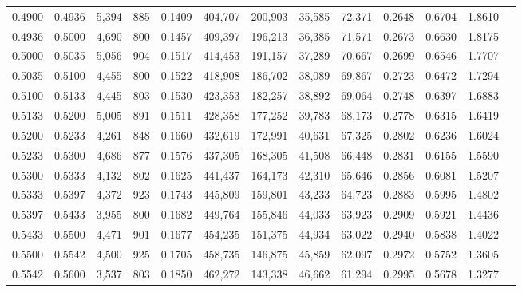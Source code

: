 \begin{tabular}{rrrrrrrrrrrrr}
0.4900 & 0.4936 &  5,394 &   885 &                                     0.1409 & 404,707 & 200,903 &  35,585 &  72,371 & 0.2648 & 0.6704 & 1.8610 \\
0.4936 & 0.5000 &  4,690 &   800 &                                     0.1457 & 409,397 & 196,213 &  36,385 &  71,571 & 0.2673 & 0.6630 & 1.8175 \\
0.5000 & 0.5035 &  5,056 &   904 &                                     0.1517 & 414,453 & 191,157 &  37,289 &  70,667 & 0.2699 & 0.6546 & 1.7707 \\
0.5035 & 0.5100 &  4,455 &   800 &                                     0.1522 & 418,908 & 186,702 &  38,089 &  69,867 & 0.2723 & 0.6472 & 1.7294 \\
0.5100 & 0.5133 &  4,445 &   803 &                                     0.1530 & 423,353 & 182,257 &  38,892 &  69,064 & 0.2748 & 0.6397 & 1.6883 \\
0.5133 & 0.5200 &  5,005 &   891 &                                     0.1511 & 428,358 & 177,252 &  39,783 &  68,173 & 0.2778 & 0.6315 & 1.6419 \\
0.5200 & 0.5233 &  4,261 &   848 &                                     0.1660 & 432,619 & 172,991 &  40,631 &  67,325 & 0.2802 & 0.6236 & 1.6024 \\
0.5233 & 0.5300 &  4,686 &   877 &                                     0.1576 & 437,305 & 168,305 &  41,508 &  66,448 & 0.2831 & 0.6155 & 1.5590 \\
0.5300 & 0.5333 &  4,132 &   802 &                                     0.1625 & 441,437 & 164,173 &  42,310 &  65,646 & 0.2856 & 0.6081 & 1.5207 \\
0.5333 & 0.5397 &  4,372 &   923 &                                     0.1743 & 445,809 & 159,801 &  43,233 &  64,723 & 0.2883 & 0.5995 & 1.4802 \\
0.5397 & 0.5433 &  3,955 &   800 &                                     0.1682 & 449,764 & 155,846 &  44,033 &  63,923 & 0.2909 & 0.5921 & 1.4436 \\
0.5433 & 0.5500 &  4,471 &   901 &                                     0.1677 & 454,235 & 151,375 &  44,934 &  63,022 & 0.2940 & 0.5838 & 1.4022 \\
0.5500 & 0.5542 &  4,500 &   925 &                                     0.1705 & 458,735 & 146,875 &  45,859 &  62,097 & 0.2972 & 0.5752 & 1.3605 \\
0.5542 & 0.5600 &  3,537 &   803 &                                     0.1850 & 462,272 & 143,338 &  46,662 &  61,294 & 0.2995 & 0.5678 & 1.3277 \\

\end{tabular}
